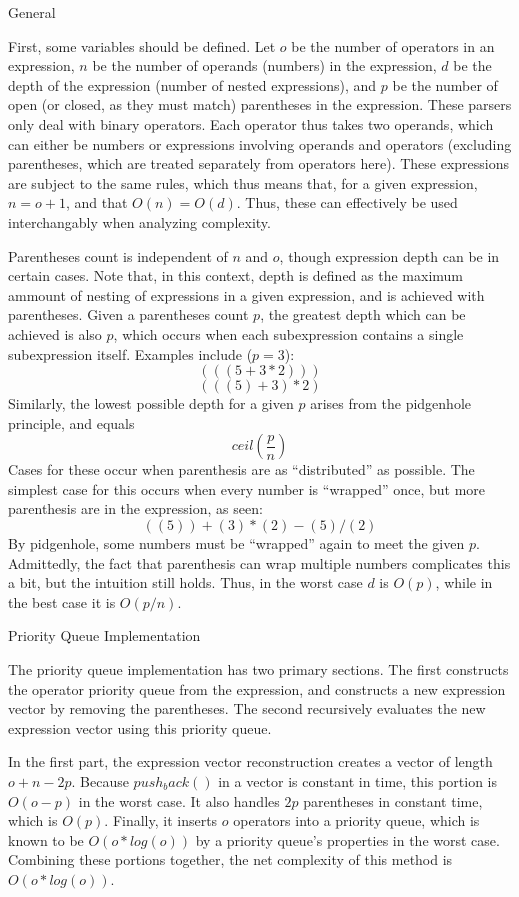 \documentclass[11pt]{article}
\begin{document}
\centerline{General}
First, some variables should be defined.
Let $o$ be the number of operators in an expression, $n$ be the number of operands (numbers) in the expression, $d$ be the depth of the expression (number of nested expressions), and $p$ be the number of open (or closed, as they must match) parentheses in the expression.
These parsers only deal with binary operators. Each operator thus takes two operands, which can either be numbers or expressions involving operands and operators (excluding parentheses, which are treated separately from operators here).
These expressions are subject to the same rules, which thus means that, for a given expression, $n=o+1$, and that $O(n)=O(d)$.
Thus, these can effectively be used interchangably when analyzing complexity.

Parentheses count is independent of $n$ and $o$, though expression depth can be in certain cases.
Note that, in this context, depth is defined as the maximum ammount of nesting of expressions in a given expression, and is achieved with parentheses.
Given a parentheses count $p$, the greatest depth which can be achieved is also $p$, which occurs when each subexpression contains a single subexpression itself.
Examples include ($p=3$):
\[(((5 + 3 * 2)))\]
\[(((5) + 3 )* 2)\]
Similarly, the lowest possible depth for a given $p$ arises from the pidgenhole principle, and equals 
\[ ceil(\frac {p} {n}) \]
Cases for these occur when parenthesis are as ``distributed'' as possible.
The simplest case for this occurs when every number is ``wrapped'' once, but more parenthesis are in the expression, as seen:
\[((5)) + (3) * (2) - (5) / (2)\]
By pidgenhole, some numbers must be ``wrapped'' again to meet the given $p$.
Admittedly, the fact that parenthesis can wrap multiple numbers complicates this a bit, but the intuition still holds.
Thus, in the worst case $d$ is $O(p)$, while in the best case it is $O(p/n)$.

\centerline{Priority Queue Implementation}
The priority queue implementation has two primary sections.
The first constructs the operator priority queue from the expression, and constructs a new expression vector by removing the parentheses.
The second recursively evaluates the new expression vector using this priority queue.

In the first part, the expression vector reconstruction creates a vector of length $o + n - 2 p$.
Because $push_back()$ in a vector is constant in time, this portion is $O(o-p)$ in the worst case.
It also handles $2p$ parentheses in constant time, which is $O(p)$.
Finally, it inserts $o$ operators into a priority queue, which is known to be $O(o*log(o))$ by a priority queue's properties in the worst case.
Combining these portions together, the net complexity of this method is $O(o*log(o))$.
\end{document}
